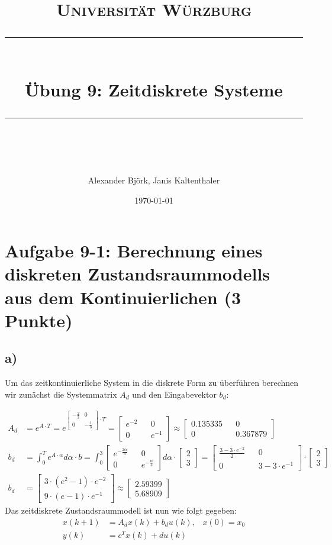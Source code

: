 \documentclass[11pt]{scrartcl} %
\title{	
	\normalfont\normalsize
	\textsc{Universität Würzburg}\\ %
	\vspace{25pt} %
	\rule{\linewidth}{0.5pt}\\ %
	\vspace{20pt} %
	{\huge Übung 9: Zeitdiskrete Systeme}\\ %
	\vspace{12pt} %
	\rule{\linewidth}{2pt}\\ %
	\vspace{12pt} %
}
\author{\LARGE Alexander Björk, Janis Kaltenthaler} %
\date{\normalsize\today} %
\begin{document}
\maketitle %


\section*{Aufgabe 9-1: Berechnung eines diskreten Zustandsraummodells aus dem Kontinuierlichen (3 Punkte)}
\subsection*{a)}
Um das zeitkontinuierliche System in die diskrete Form zu überführen berechnen wir zunächst die Systemmatrix $A_d$ und den Eingabevektor $b_d$:

\begin{align*}
A_d&=e^{A\cdot T}=e^{\begin{bmatrix}-\frac{2}{3}&0\\0&-\frac{1}{3}\end{bmatrix}\cdot T}=\begin{bmatrix}e^{-2}&&0\\0&&e^{-1} \end{bmatrix}\approx\begin{bmatrix}0.135335&&0\\0&&0.367879 \end{bmatrix}\\
b_d&=\int_{0}^{T}e^{A\cdot\alpha}d\alpha\cdot b=\int_{0}^{3}\begin{bmatrix}e^{-\frac{2\alpha}{3}}&&0\\0&&e^{-\frac{\alpha}{3}} \end{bmatrix} d\alpha\cdot \begin{bmatrix}2\\3 \end{bmatrix}=\begin{bmatrix}\frac{3-3\cdot e^{-2}}{2}&&0\\0&&3-3\cdot e^{-1} \end{bmatrix}\cdot \begin{bmatrix}2\\3 \end{bmatrix}\\
b_d&=\begin{bmatrix}3\cdot(e^2-1)\cdot e^{-2}\\ 9\cdot(e-1)\cdot e^{-1}\end{bmatrix}\approx\begin{bmatrix}2.59399\\5.68909\end{bmatrix}
\end{align*}
Das zeitdiskrete Zustandsraummodell ist nun wie folgt gegeben:
\begin{align*}
	x(k+1)&=A_dx(k)+b_du(k),\hspace{10pt} x(0)=x_0\\
	y(k)&=c^Tx(k)+du(k)
\end{align*}
\end{document}
